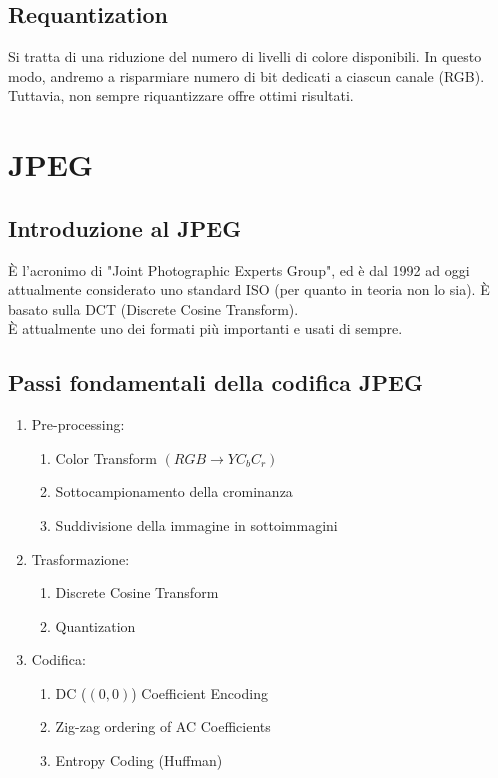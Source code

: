 \documentclass{report}
\begin{document}
	\subsection{Requantization}
	Si tratta di una riduzione del numero di livelli di colore disponibili. In questo modo, andremo a risparmiare numero di bit dedicati a ciascun canale (RGB). Tuttavia, non sempre riquantizzare offre ottimi risultati.
	
	\newpage
	
	\section{JPEG}
	\subsection{Introduzione al JPEG}
	È l'acronimo di "Joint Photographic Experts Group", ed è dal 1992 ad oggi attualmente considerato uno standard ISO (per quanto in teoria non lo sia). È basato sulla DCT (Discrete Cosine Transform).\\
	È attualmente uno dei formati più importanti e usati di sempre. 
	\subsection{Passi fondamentali della codifica JPEG}
	\begin{enumerate}
		\item Pre-processing:
		      \begin{enumerate}
		      	\item Color Transform $(RGB \rightarrow YC_bC_r)$
		      	\item Sottocampionamento della crominanza
		      	\item Suddivisione della immagine in sottoimmagini
		      \end{enumerate}
		\item Trasformazione:
		      \begin{enumerate}
		      	\item Discrete Cosine Transform
		      	\item Quantization
		      \end{enumerate}
		      
		\item Codifica:
		      \begin{enumerate}
		      	\item DC ($(0,0)$) Coefficient Encoding
		      	\item Zig-zag ordering of AC Coefficients
		      	\item Entropy Coding (Huffman)
		      \end{enumerate}
	\end{enumerate}
	
\end{document}
